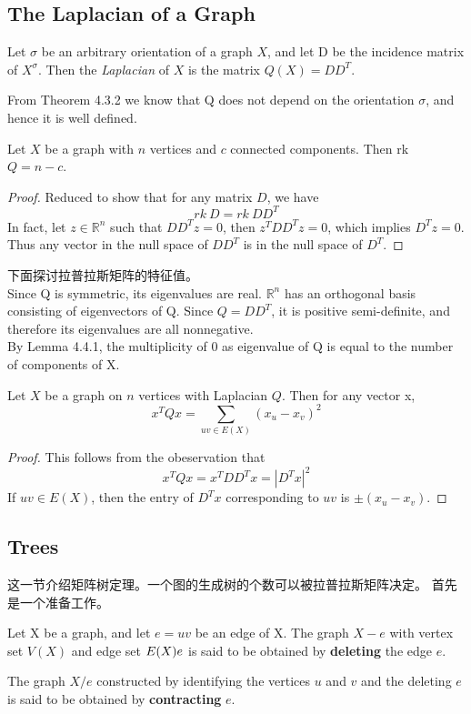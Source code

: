 \documentclass[11pt,fleqn]{book} %
\def\R{\mathbb{R}}
\begin{document}
\begin{CJK}{UTF8}{gkai}
\section{The Laplacian of a Graph}
\begin{definition}
     Let $\sigma$ be an arbitrary orientation of a graph $X$, and let D be the incidence matrix of $X^\sigma$. Then the \textit{Laplacian} of $X$ is the matrix $Q(X) = DD^T$.
\end{definition}
\begin{remark}
    From Theorem 4.3.2 we know that Q does not depend on the orientation $\sigma$, and hence it is well defined.
\end{remark}

\begin{lemma}
    Let $X$ be a graph with $n$ vertices and $c$ connected components. Then rk $Q = n - c$.
\end{lemma}
\begin{proof}
    Reduced to show that for any matrix $D$, we have 
    \[
        rk \ D = rk \ DD^T\] 
    In fact, let $z \in \R^n  $ such that $DD^Tz = 0$, then $z^TDD^Tz = 0$, which implies $ D^Tz=0$. Thus any vector in the null space of $DD^T$ is in the null space of $D^T$.
\end{proof}
下面探讨拉普拉斯矩阵的特征值。 \\
Since Q is symmetric, its eigenvalues are real. $\R^n$ has an orthogonal basis consisting of eigenvectors of Q. Since $Q = DD^T$, it is positive semi-definite, and therefore its eigenvalues are all nonnegative. \\
By Lemma 4.4.1, the multiplicity of 0 as eigenvalue of Q is equal to the number of components of X.


\begin{lemma}
    [拉普拉斯二次型] Let $X$ be a graph on $n$ vertices with Laplacian $Q$. Then for any vector x,
    \[
        x^TQx = \sum_{uv \in E(X)}(x_u - x_v)^2\]
\end{lemma}
\begin{proof}
    This follows from the obeservation that 
    \[
        x^TQx = x^TDD^Tx = |D^Tx|^2\]
    If $uv \in E(X)$, then the entry of $D^Tx$ corresponding to $uv$ is $\pm(x_u - x_v)$.    
\end{proof}

\subsection{Trees}
这一节介绍矩阵树定理。一个图的生成树的个数可以被拉普拉斯矩阵决定。
首先是一个准备工作。
\begin{definition}
     Let X be a graph, and let $e = uv$ be an edge of X. The graph $X - e$ with vertex set $V(X)$ and edge set $E(X)\\e$ is said to be obtained by \textbf{deleting} the edge $e$.
\end{definition}
\begin{definition}
     The graph $X/e$ constructed by identifying the vertices $u$ and $v$ and the deleting $e$ is said to be obtained by \textbf{contracting} $e$.
\end{definition}


\end{CJK}
\end{document}
